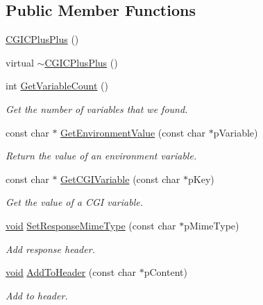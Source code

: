 \subsection*{\-Public \-Member \-Functions}
\begin{DoxyCompactItemize}
\item 
\hyperlink{class_c_g_i_c_plus_plus_a9fca234b02a37170066c13e139cf304c}{\-C\-G\-I\-C\-Plus\-Plus} ()
\item 
virtual \hyperlink{class_c_g_i_c_plus_plus_ad2053bb2b45984aa8ea326b3e1baa805}{$\sim$\-C\-G\-I\-C\-Plus\-Plus} ()
\item 
int \hyperlink{class_c_g_i_c_plus_plus_a53a8d30eb76e65d6da90c804dea755dc}{\-Get\-Variable\-Count} ()
\begin{DoxyCompactList}\small\item\em \-Get the number of variables that we found. \end{DoxyCompactList}\item 
const char $\ast$ \hyperlink{class_c_g_i_c_plus_plus_a202b1ce20242b0556003c8771bd32563}{\-Get\-Environment\-Value} (const char $\ast$p\-Variable)
\begin{DoxyCompactList}\small\item\em \-Return the value of an environment variable. \end{DoxyCompactList}\item 
const char $\ast$ \hyperlink{class_c_g_i_c_plus_plus_a1789fec84be38c186f166011368c9beb}{\-Get\-C\-G\-I\-Variable} (const char $\ast$p\-Key)
\begin{DoxyCompactList}\small\item\em \-Get the value of a \-C\-G\-I variable. \end{DoxyCompactList}\item 
\hyperlink{_cpclient_8h_a6464f7480a0fd0ee170cba12b2c0497f}{void} \hyperlink{class_c_g_i_c_plus_plus_a715711e9f674fff734a64120c5600ab2}{\-Set\-Response\-Mime\-Type} (const char $\ast$p\-Mime\-Type)
\begin{DoxyCompactList}\small\item\em \-Add response header. \end{DoxyCompactList}\item 
\hyperlink{_cpclient_8h_a6464f7480a0fd0ee170cba12b2c0497f}{void} \hyperlink{class_c_g_i_c_plus_plus_ac8ca7c0557a670b8232ff3d8a6ed6280}{\-Add\-To\-Header} (const char $\ast$p\-Content)
\begin{DoxyCompactList}\small\item\em \-Add to header. \end{DoxyCompactList}\item 

\end{DoxyCompactItemize}
